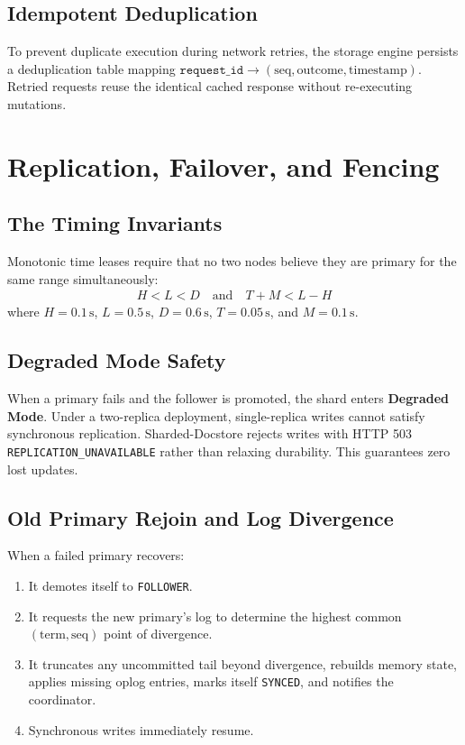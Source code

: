 \documentclass[10pt,journal,compsoc]{IEEEtran}
\begin{document}
\subsection{Idempotent Deduplication}
To prevent duplicate execution during network retries, the storage engine persists a deduplication table mapping $\texttt{request\_id} \to (\text{seq}, \text{outcome}, \text{timestamp})$. Retried requests reuse the identical cached response without re-executing mutations.

\section{Replication, Failover, and Fencing}

\subsection{The Timing Invariants}
Monotonic time leases require that no two nodes believe they are primary for the same range simultaneously:
\begin{align}
H < L < D \quad \text{and} \quad T + M < L - H
\end{align}
where $H=0.1\,\text{s}$, $L=0.5\,\text{s}$, $D=0.6\,\text{s}$, $T=0.05\,\text{s}$, and $M=0.1\,\text{s}$.

\subsection{Degraded Mode Safety}
When a primary fails and the follower is promoted, the shard enters \textbf{Degraded Mode}. Under a two-replica deployment, single-replica writes cannot satisfy synchronous replication. Sharded-Docstore rejects writes with HTTP 503 \texttt{REPLICATION\_UNAVAILABLE} rather than relaxing durability. This guarantees zero lost updates.

\subsection{Old Primary Rejoin and Log Divergence}
When a failed primary recovers:
\begin{enumerate}
    \item It demotes itself to \texttt{FOLLOWER}.
    \item It requests the new primary's log to determine the highest common $(\text{term}, \text{seq})$ point of divergence.
    \item It truncates any uncommitted tail beyond divergence, rebuilds memory state, applies missing oplog entries, marks itself \texttt{SYNCED}, and notifies the coordinator.
    \item Synchronous writes immediately resume.
\end{enumerate}
\end{document}
